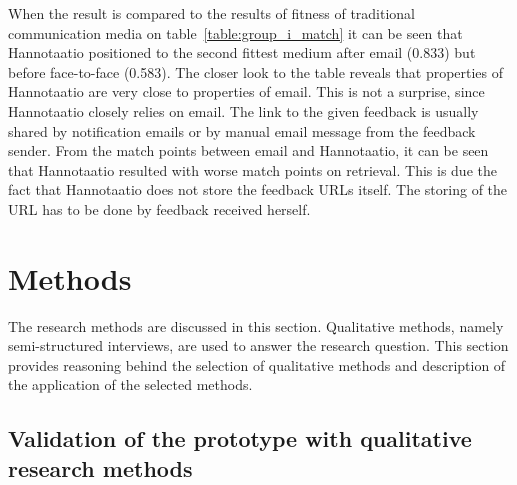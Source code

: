 \documentclass[english,12pt,a4paper,pdftex]{article}
\begin{document}
When the result is compared to the results of fitness of traditional communication media on table~\ref{table:group_i_match} it can be seen that Hannotaatio positioned to the second fittest medium after email (0.833) but before face-to-face (0.583). The closer look to the table reveals that properties of Hannotaatio are very close to properties of email. This is not a surprise, since Hannotaatio closely relies on email. The link to the given feedback is usually shared by notification emails or by manual email message from the feedback sender. From the match points between email and Hannotaatio, it can be seen that Hannotaatio resulted with worse match points on retrieval. This is due the fact that Hannotaatio does not store the feedback \acs{URL}s itself. The storing of the \ac{URL} has to be done by feedback received herself.

\clearpage

\section{Methods}
\label{sec:methods}
\acresetall

The research methods are discussed in this section. Qualitative methods, namely semi-structured interviews, are used to answer the research question. This section provides reasoning behind the selection of qualitative methods and description of the application of the selected methods.

\subsection{Validation of the prototype with qualitative research methods}

\end{document}
